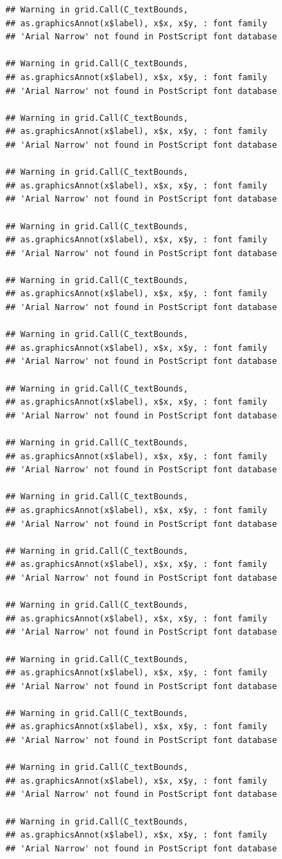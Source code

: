 \documentclass[]{krantz}
\begin{document}
\begin{verbatim}
## Warning in grid.Call(C_textBounds,
## as.graphicsAnnot(x$label), x$x, x$y, : font family
## 'Arial Narrow' not found in PostScript font database

## Warning in grid.Call(C_textBounds,
## as.graphicsAnnot(x$label), x$x, x$y, : font family
## 'Arial Narrow' not found in PostScript font database

## Warning in grid.Call(C_textBounds,
## as.graphicsAnnot(x$label), x$x, x$y, : font family
## 'Arial Narrow' not found in PostScript font database

## Warning in grid.Call(C_textBounds,
## as.graphicsAnnot(x$label), x$x, x$y, : font family
## 'Arial Narrow' not found in PostScript font database

## Warning in grid.Call(C_textBounds,
## as.graphicsAnnot(x$label), x$x, x$y, : font family
## 'Arial Narrow' not found in PostScript font database

## Warning in grid.Call(C_textBounds,
## as.graphicsAnnot(x$label), x$x, x$y, : font family
## 'Arial Narrow' not found in PostScript font database

## Warning in grid.Call(C_textBounds,
## as.graphicsAnnot(x$label), x$x, x$y, : font family
## 'Arial Narrow' not found in PostScript font database

## Warning in grid.Call(C_textBounds,
## as.graphicsAnnot(x$label), x$x, x$y, : font family
## 'Arial Narrow' not found in PostScript font database

## Warning in grid.Call(C_textBounds,
## as.graphicsAnnot(x$label), x$x, x$y, : font family
## 'Arial Narrow' not found in PostScript font database

## Warning in grid.Call(C_textBounds,
## as.graphicsAnnot(x$label), x$x, x$y, : font family
## 'Arial Narrow' not found in PostScript font database

## Warning in grid.Call(C_textBounds,
## as.graphicsAnnot(x$label), x$x, x$y, : font family
## 'Arial Narrow' not found in PostScript font database

## Warning in grid.Call(C_textBounds,
## as.graphicsAnnot(x$label), x$x, x$y, : font family
## 'Arial Narrow' not found in PostScript font database

## Warning in grid.Call(C_textBounds,
## as.graphicsAnnot(x$label), x$x, x$y, : font family
## 'Arial Narrow' not found in PostScript font database

## Warning in grid.Call(C_textBounds,
## as.graphicsAnnot(x$label), x$x, x$y, : font family
## 'Arial Narrow' not found in PostScript font database

## Warning in grid.Call(C_textBounds,
## as.graphicsAnnot(x$label), x$x, x$y, : font family
## 'Arial Narrow' not found in PostScript font database

## Warning in grid.Call(C_textBounds,
## as.graphicsAnnot(x$label), x$x, x$y, : font family
## 'Arial Narrow' not found in PostScript font database
\end{verbatim}
\end{document}
